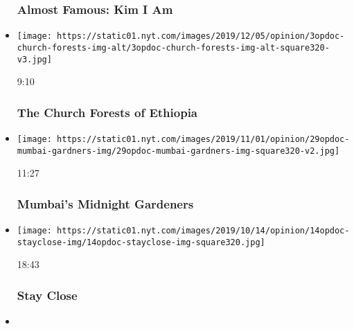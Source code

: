 \begin{itemize}
{  \subsubsection{Almost Famous: Kim I Am}\label{almost-famous-kim-i-am}}
\item
  \href{https://www.nytimes.com/video/opinion/100000006808736/the-church-forests-of-ethiopia.html?action=click\&module=video-series-bar\&region=header\&pgtype=Article\&playlistId=video/op-docs}{}

  \texttt{[image: https://static01.nyt.com/images/2019/12/05/opinion/3opdoc-church-forests-img-alt/3opdoc-church-forests-img-alt-square320-v3.jpg]}

  9:10

  \hypertarget{the-church-forests-of-ethiopia}{%
  \subsubsection{The Church Forests of
  Ethiopia}\label{the-church-forests-of-ethiopia}}
\item
  \href{https://www.nytimes.com/video/opinion/100000006616228/mumbais-midnight-gardeners.html?action=click\&module=video-series-bar\&region=header\&pgtype=Article\&playlistId=video/op-docs}{}

  \texttt{[image: https://static01.nyt.com/images/2019/11/01/opinion/29opdoc-mumbai-gardners-img/29opdoc-mumbai-gardners-img-square320-v2.jpg]}

  11:27

  \hypertarget{mumbais-midnight-gardeners}{%
  \subsubsection{Mumbai's Midnight
  Gardeners}\label{mumbais-midnight-gardeners}}
\item
  \href{https://www.nytimes.com/video/opinion/100000006594650/stay-close.html?action=click\&module=video-series-bar\&region=header\&pgtype=Article\&playlistId=video/op-docs}{}

  \texttt{[image: https://static01.nyt.com/images/2019/10/14/opinion/14opdoc-stayclose-img/14opdoc-stayclose-img-square320.jpg]}

  18:43

  \hypertarget{stay-close}{%
  \subsubsection{Stay Close}\label{stay-close}}
\item
  \href{https://www.nytimes.com/video/opinion/100000006430755/walk-run-cha-cha.html?action=click\&module=video-series-bar\&region=header\&pgtype=Article\&playlistId=video/op-docs}{}


\end{itemize}
